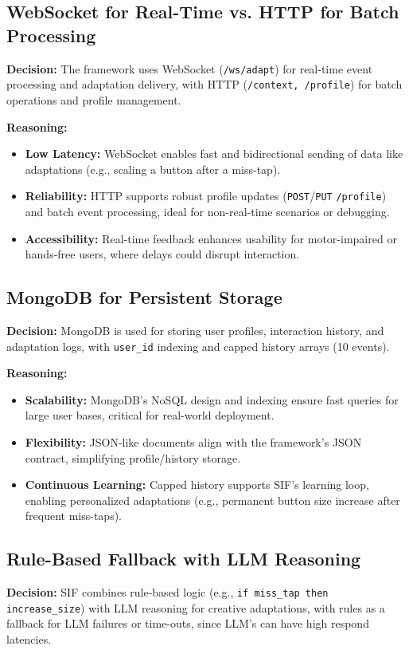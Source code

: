 \documentclass[openany]{book}
\begin{document}
\subsection{WebSocket for Real-Time vs. HTTP for Batch Processing}
\textbf{Decision:} The framework uses WebSocket (\texttt{/ws/adapt}) for real-time event processing and adaptation delivery, with HTTP (\texttt{/context, /profile}) for batch operations and profile management.

\textbf{Reasoning:}
\begin{itemize}
    \item \textbf{Low Latency:} WebSocket enables fast and bidirectional sending of data like adaptations (e.g., scaling a button after a miss-tap).
    \item \textbf{Reliability:} HTTP supports robust profile updates (\texttt{POST}/\texttt{PUT} \texttt{/profile}) and batch event processing, ideal for non-real-time scenarios or debugging.
    \item \textbf{Accessibility:} Real-time feedback enhances usability for motor-impaired or hands-free users, where delays could disrupt interaction. 
\end{itemize}

\subsection{MongoDB for Persistent Storage}
\textbf{Decision:} MongoDB is used for storing user profiles, interaction history, and adaptation logs, with \texttt{user\_id} indexing and capped history arrays (10 events).

\textbf{Reasoning:}
\begin{itemize}
  \item \textbf{Scalability:} MongoDB’s NoSQL design and indexing ensure fast queries for large user bases, critical for real-world deployment.
  \item \textbf{Flexibility:} JSON-like documents align with the framework’s JSON contract, simplifying profile/history storage.
  \item \textbf{Continuous Learning:} Capped history supports SIF’s learning loop, enabling personalized adaptations (e.g., permanent button size increase after frequent miss-taps).
\end{itemize}

\subsection{Rule-Based Fallback with LLM Reasoning}
\textbf{Decision:} SIF combines rule-based logic (e.g., \texttt{if miss\_tap then increase\_size}) with LLM reasoning for creative adaptations, with rules as a fallback for LLM failures or time-outs, since LLM's can have high respond latencies.
\end{document}
